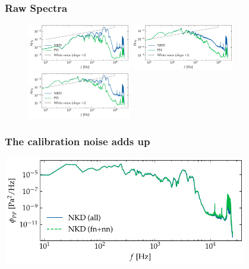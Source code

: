 \documentclass[aspectratio=169,9pt]{beamer}
\begin{document}
\begin{frame}
  \frametitle{Raw Spectra}
  \begin{figure}
    \centering
    \includegraphics[width=0.4\textwidth]{sanity/50psi/PH-NKD/calib_spectra_50psi_nonoise.pdf}
    \includegraphics[width=0.4\textwidth]{sanity/50psi/PH-NKD/calib_spectra_50psi_noise.pdf}
    \includegraphics[width=0.4\textwidth]{sanity/50psi/PH-NKD/calib_spectra_50psi_noiseWN.pdf}
  \end{figure}
\end{frame}

\begin{frame}
  \frametitle{The calibration noise adds up}
    \centering
    \includegraphics[width=0.8\textwidth]{sanity/50psi/PH-NKD/calib_spectra_50psi_nkd_fn_plus_nn.pdf}
\end{frame}
\end{document}
